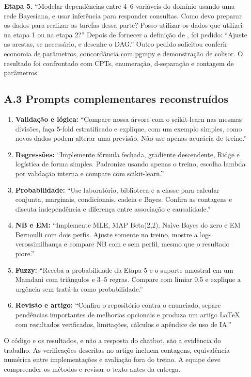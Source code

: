 \documentclass[10pt,a4paper]{article}
\newcommand{\cod}[1]{\texttt{\detokenize{#1}}}
\begin{document}
\textbf{Etapa 5.} ``Modelar dependências entre 4--6 variáveis do domínio usando uma rede Bayesiana, e usar inferência para responder consultas. Como devo preparar os dados para realizar as tarefas dessa parte? Posso utilizar os dados que utilizei na etapa 1 ou na etapa 2?'' Depois de fornecer a definição de \cod{infra_digital_basica}, foi pedido: ``Ajuste as arestas, se necessário, e desenhe o DAG.'' Outro pedido solicitou conferir economia de parâmetros, concordância com pgmpy e demonstração de colisor. O resultado foi confrontado com CPTs, enumeração, d-separação e contagem de parâmetros.

\subsection*{A.3 Prompts complementares reconstruídos}
\begin{enumerate}[label=\arabic*.]
\item \textbf{Validação e lógica:} ``Compare nossa árvore com o scikit-learn nas mesmas divisões, faça 5-fold estratificado e explique, com um exemplo simples, como novos dados podem alterar uma previsão. Não use apenas acurácia de treino.''
\item \textbf{Regressões:} ``Implemente fórmula fechada, gradiente descendente, Ridge e logística de forma simples. Padronize usando apenas o treino, escolha lambda por validação interna e compare com scikit-learn.''
\item \textbf{Probabilidade:} ``Use laboratório, biblioteca e a classe para calcular conjunta, marginais, condicionais, cadeia e Bayes. Confira as contagens e discuta independência e diferença entre associação e causalidade.''
\item \textbf{NB e EM:} ``Implemente MLE, MAP Beta(2,2), Naive Bayes do zero e EM Bernoulli com dois perfis. Ajuste somente no treino, mostre a log-verossimilhança e compare NB com e sem perfil, mesmo que o resultado piore.''
\item \textbf{Fuzzy:} ``Receba a probabilidade da Etapa 5 e o suporte amostral em um Mamdani com triângulos e 3--5 regras. Compare com limiar 0,5 e explique a urgência sem tratá-la como probabilidade.''
\item \textbf{Revisão e artigo:} ``Confira o repositório contra o enunciado, separe pendências importantes de melhorias opcionais e produza um artigo LaTeX com resultados verificados, limitações, cálculos e apêndice de uso de IA.''
\end{enumerate}
O código e os resultados, e não a resposta do chatbot, são a evidência do trabalho. As verificações descritas no artigo incluem contagens, equivalência numérica entre implementações e avaliação fora do treino. A equipe deve compreender os métodos e revisar o texto antes da entrega.
\end{document}
